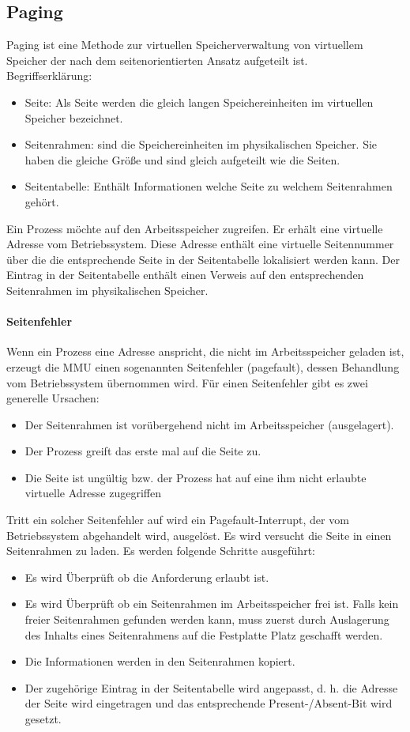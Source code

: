 \subsection{Paging}
Paging ist eine Methode zur virtuellen Speicherverwaltung von virtuellem Speicher der nach dem seitenorientierten Ansatz aufgeteilt ist. \\[3mm]
Begriffserklärung:
\begin{itemize}
	\item Seite: Als Seite werden die gleich langen Speichereinheiten im virtuellen Speicher bezeichnet.
	\item Seitenrahmen: sind die Speichereinheiten im physikalischen Speicher. Sie haben die gleiche Größe und sind gleich aufgeteilt wie die Seiten.
	\item Seitentabelle: Enthält Informationen welche Seite zu welchem Seitenrahmen gehört.  
\end{itemize}
Ein Prozess möchte auf den Arbeitsspeicher zugreifen. Er erhält eine virtuelle Adresse vom Betriebssystem. Diese Adresse enthält eine virtuelle Seitennummer über die die entsprechende Seite in der Seitentabelle lokalisiert werden kann. Der Eintrag in der Seitentabelle enthält einen Verweis auf den entsprechenden Seitenrahmen im physikalischen Speicher. 
\paragraph{Seitenfehler}
Wenn ein Prozess eine Adresse anspricht, die nicht im Arbeitsspeicher geladen ist, erzeugt die MMU einen sogenannten Seitenfehler (pagefault), dessen Behandlung vom Betriebssystem übernommen wird. Für einen Seitenfehler gibt es zwei generelle Ursachen:
\begin{itemize}
	\item Der Seitenrahmen ist vorübergehend nicht im Arbeitsspeicher (ausgelagert).
	\item Der Prozess greift das erste mal auf die Seite zu.
	\item Die Seite ist ungültig bzw. der Prozess hat auf eine ihm nicht erlaubte virtuelle Adresse zugegriffen
\end{itemize}
Tritt ein solcher Seitenfehler auf wird ein Pagefault-Interrupt, der vom Betriebssystem abgehandelt wird, ausgelöst. Es wird versucht die Seite in einen Seitenrahmen zu laden. Es werden folgende Schritte ausgeführt:
\begin{itemize}
	\item Es wird Überprüft ob die Anforderung erlaubt ist.
	\item Es wird Überprüft ob ein Seitenrahmen im Arbeitsspeicher frei ist. Falls kein freier Seitenrahmen gefunden werden kann, muss zuerst durch Auslagerung des Inhalts eines Seitenrahmens auf die Festplatte Platz geschafft werden.
	\item Die Informationen werden in den Seitenrahmen kopiert.
	\item Der zugehörige Eintrag in der Seitentabelle wird angepasst, d. h. die Adresse der Seite wird eingetragen und das entsprechende Present-/Absent-Bit wird gesetzt.
\end{itemize}
